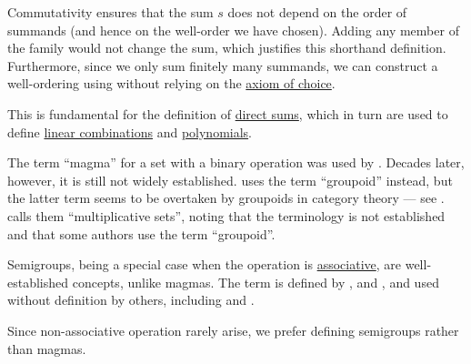 \begin{remark}
\begin{thmenum}
\begin{thmenum}
      Commutativity ensures that the sum \( s \) does not depend on the order of summands (and hence on the well-order we have chosen). Adding any member of the family would not change the sum, which justifies this shorthand definition. Furthermore, since we only sum finitely many summands, we can construct a well-ordering using  without relying on the \hyperref[def:zfc/choice]{axiom of choice}.

      This is fundamental for the definition of \hyperref[def:semimodule_direct_sum]{direct sums}, which in turn are used to define \hyperref[def:linear_combination]{linear combinations} and \hyperref[def:polynomial_algebra]{polynomials}.
    \end{thmenum}
  \end{thmenum}
\end{remark}

\begin{remark}\label{rem:magma_terminology}
  The term \enquote{magma} for a set with a binary operation was used by . Decades later, however, it is still not widely established.  uses the term \enquote{groupoid} instead, but the latter term seems to be overtaken by groupoids in category theory --- see .  calls them \enquote{multiplicative sets}, noting that the terminology is not established and that some authors use the term \enquote{groupoid}.

  Semigroups, being a special case when the operation is \hyperref[def:binary_operation/associative]{associative}, are well-established concepts, unlike magmas. The term is defined by ,  and , and used without definition by others, including  and .

  Since non-associative operation rarely arise, we prefer defining semigroups rather than magmas.
\end{remark}

